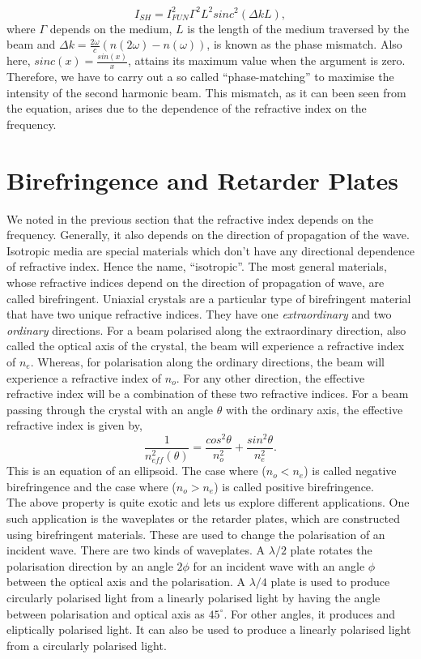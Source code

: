 \begin{equation}
    I_{SH} = I_{FUN}^2 \Gamma^2 L^2 sinc^2(\Delta k L),
\end{equation}
where $\Gamma$ depends on the medium, $L$ is the length of the medium traversed by the beam and $\Delta k = \frac{2\omega}{c}(n(2\omega)-n(\omega))$, is known as the phase mismatch. Also here, $sinc(x) = \frac{sin(x)}{x}$, attains its maximum value when the argument is zero. Therefore, we have to carry out a so called ``phase-matching'' to maximise the intensity of the second harmonic beam. This mismatch, as it can been seen from the equation, arises due to the dependence of the refractive index on the frequency.

\section{Birefringence and Retarder Plates}
We noted in the previous section that the refractive index depends on the frequency. Generally, it also depends on the direction of propagation of the wave. Isotropic media are special materials which don't have any directional dependence of refractive index. Hence the name, ``isotropic''. The most general materials, whose refractive indices depend on the direction of propagation of wave, are called birefringent. Uniaxial crystals are a particular type of birefringent material that have two unique refractive indices. They have one \textit{extraordinary} and two \textit{ordinary} directions. For a beam polarised along the extraordinary direction, also called the optical axis of the crystal, the beam will experience a refractive index of $n_e$. Whereas, for polarisation along the ordinary directions, the beam will experience a refractive index of $n_o$. For any other direction, the effective refractive index will be a combination of these two refractive indices. For a beam passing through the crystal with an angle $\theta$ with the ordinary axis, the effective refractive index is given by,
\begin{equation}
    \frac{1}{n_{eff}^2(\theta)} = \frac{cos^2\theta}{n_o^2} + \frac{sin^2\theta}{n_e^2}.
\end{equation}
This is an equation of an ellipsoid. The case where ($n_o < n_e$) is called negative birefringence and the case where ($n_o > n_e$) is called positive birefringence.\\
The above property is quite exotic and lets us explore different applications. One such application is the waveplates or the retarder plates, which are constructed using birefringent materials. These are used to change the polarisation of an incident wave. There are two kinds of waveplates. A $\lambda/2$ plate rotates the polarisation direction by an angle $2\phi$ for an incident wave with an angle $\phi$ between the optical axis and the polarisation. A $\lambda/4$ plate is used to produce circularly polarised light from a linearly polarised light by having the angle between polarisation and optical axis as $45^{\circ}$. For other angles, it produces and eliptically polarised light. It can also be used to produce a linearly polarised light from a circularly polarised light.

